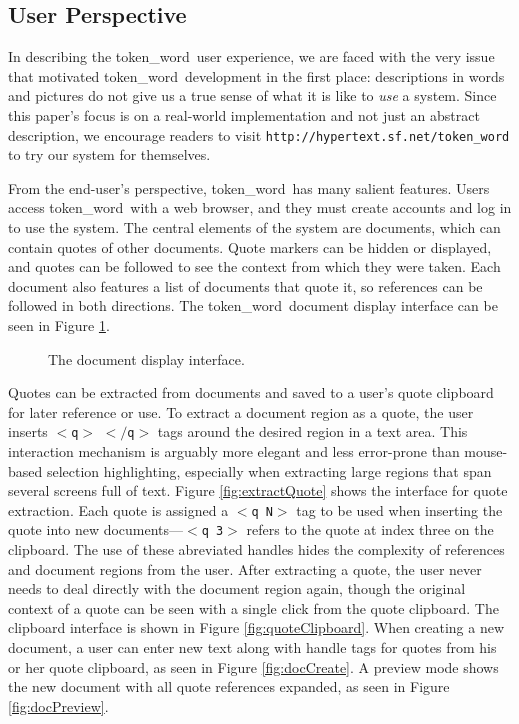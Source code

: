 \documentclass{acm_proc_article-sp}
\newcommand{\tokenWord}{token\_word}
\begin{document}
\subsection{User Perspective}
In describing the \tokenWord \  user experience, we are faced with the very issue that motivated \tokenWord \  development in the first place:  descriptions in words and pictures do not give us a true sense of what it is like to \textit{use} a system.
Since this paper's focus is on a real-world implementation and not just an abstract description, we encourage readers to visit \texttt{http://hypertext.sf.net/token\_word} to try our system for themselves. 

From the end-user's perspective, \tokenWord \  has many sal\-ient features.
Users access \tokenWord \  with a web browser, and they must create accounts and log in to use the system.  
The central elements of the system are documents, which can contain quotes of other documents.
Quote markers can be hidden or displayed, and quotes can be followed to see the context from which they were taken.
Each document also features a list of documents that quote it, so references can be followed in both directions.
The \tokenWord \  document display interface can be seen in Figure \ref{fig:mainScreen}.

\begin{figure}[t]
\centering
{}
\caption{The document display interface.}
\label{fig:mainScreen}
\end{figure}  

Quotes can be extracted from documents and saved to a user's quote clipboard for later reference or use.
To extract a document region as a quote, the user inserts $<$\texttt{q}$>$ $<$$/$\texttt{q}$>$ tags around the desired region in a text area.
This interaction mechanism is arguably more elegant and less error-prone than mouse-based selection highlighting, especially when extracting large regions that span several screens full of text.
Figure \ref{fig:extractQuote} shows the interface for quote extraction. 
Each quote is assigned a $<$\texttt{q N}$>$ tag to be used when inserting the quote into new documents---$<$\texttt{q 3}$>$ refers to the quote at index three on the clipboard.
The use of these abreviated handles hides the complexity of references and document regions from the user.
After extracting a quote, the user never needs to deal directly with the document region again, though the original context of a quote can be seen with a single click from the quote clipboard.
The clipboard interface is shown in Figure \ref{fig:quoteClipboard}.
When creating a new document, a user can enter new text along with handle tags for quotes from his or her quote clipboard, as seen in Figure \ref{fig:docCreate}.
A preview mode shows the new document with all quote references expanded, as seen in Figure \ref{fig:docPreview}.
\end{document}
